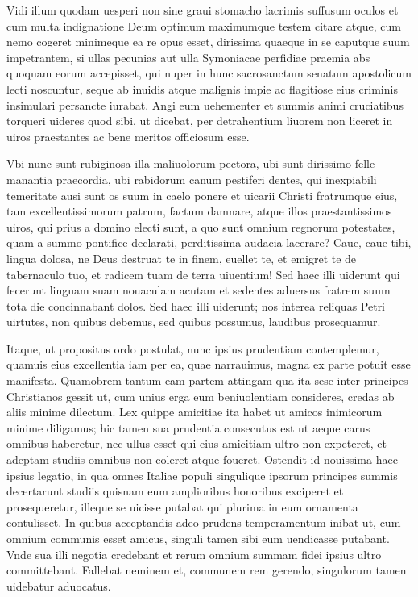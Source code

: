 \documentclass[a5paper,twoside]{article}
\begin{document}
Vidi illum quodam uesperi non sine graui stomacho lacrimis suffusum oculos et cum multa indignatione Deum optimum maximumque testem citare atque, cum nemo cogeret minimeque ea re opus esset, dirissima quaeque in se caputque suum impetrantem, si ullas pecunias aut ulla Symoniacae perfidiae praemia abs quoquam eorum accepisset, qui nuper in hunc sacrosanctum senatum apostolicum lecti noscuntur, seque ab inuidis atque malignis impie ac flagitiose eius criminis insimulari persancte iurabat. Angi eum uehementer et summis animi cruciatibus torqueri uideres quod sibi, ut dicebat, per detrahentium liuorem non liceret in uiros praestantes ac bene meritos officiosum esse.

Vbi nunc sunt rubiginosa illa maliuolorum pectora, ubi sunt dirissimo felle manantia praecordia, ubi rabidorum canum pestiferi dentes, qui inexpiabili temeritate ausi sunt os suum in caelo ponere et uicarii Christi fratrumque eius, tam excellentissimorum patrum, factum damnare, atque illos praestantissimos uiros, qui prius a domino electi sunt, a quo sunt omnium regnorum potestates, quam a summo pontifice declarati, perditissima audacia lacerare?  Caue, caue tibi, lingua dolosa, ne Deus destruat te in finem, euellet te, et emigret te de tabernaculo tuo, et radicem tuam de terra uiuentium!  Sed haec illi uiderunt qui fecerunt linguam suam nouaculam acutam et sedentes aduersus fratrem suum tota die concinnabant dolos. Sed haec illi uiderunt; nos interea reliquas Petri uirtutes, non quibus debemus, sed quibus possumus, laudibus prosequamur.

Itaque, ut propositus ordo postulat, nunc ipsius prudentiam contemplemur, quamuis eius excellentia iam per ea, quae narrauimus, magna ex parte potuit esse manifesta. Quamobrem tantum eam partem attingam qua ita sese inter principes Christianos gessit ut, cum unius erga eum beniuolentiam consideres, credas ab aliis minime dilectum. Lex quippe amicitiae ita habet ut amicos inimicorum minime diligamus; hic tamen sua prudentia consecutus est ut aeque carus omnibus haberetur, nec ullus esset qui eius amicitiam ultro non expeteret, et adeptam studiis omnibus non coleret atque foueret. Ostendit id nouissima haec ipsius legatio, in qua omnes Italiae populi singulique ipsorum principes summis decertarunt studiis quisnam eum amplioribus honoribus exciperet et prosequeretur, illeque se uicisse putabat qui plurima in eum ornamenta contulisset. In quibus acceptandis adeo prudens temperamentum inibat ut, cum omnium communis esset amicus, singuli tamen sibi eum uendicasse putabant. Vnde sua illi negotia credebant et rerum omnium summam fidei ipsius ultro committebant. Fallebat neminem et, communem rem gerendo, singulorum tamen uidebatur aduocatus. 
\end{document}
